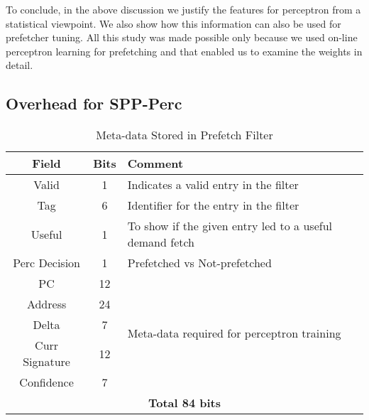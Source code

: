 \documentclass{sig-alternate}
\begin{document}
To conclude, in the above discussion we justify the features for perceptron from a statistical viewpoint.
We also show how this information can also be used for prefetcher tuning.
All this study was made possible only because we used on-line perceptron learning for prefetching and that enabled us to examine the weights in detail.


\subsection{Overhead for SPP-Perc}

\begin{table}[]
    \centering
    \begin{tabular}{|c|c|m{4.8cm}|}
    \hline
        \textbf{Field} &
        \textbf{Bits} &
        \textbf{Comment} \\
    \hline
         Valid & 1 & Indicates a valid entry in the filter\\
         Tag & 6 & Identifier for the entry in the filter\\
         Useful & 1 & To show if the given entry led to a useful demand fetch\\
         Perc Decision & 1 & Prefetched vs Not-prefetched \\
    \hline
        PC & 12 & \multirow{5}{4.8cm}{Meta-data required for perceptron training}\\
        Address & 24 & \\
        Delta & 7 & \\
        Curr Signature & 12 & \\
        Confidence & 7 & \\
    \hline
        \multicolumn{3}{|c|}{\textbf{Total 84 bits}}\\
    \hline
    \end{tabular}
    \caption{Meta-data Stored in Prefetch Filter}
    \label{tab:PF_metadata}
\end{table}
\end{document}
